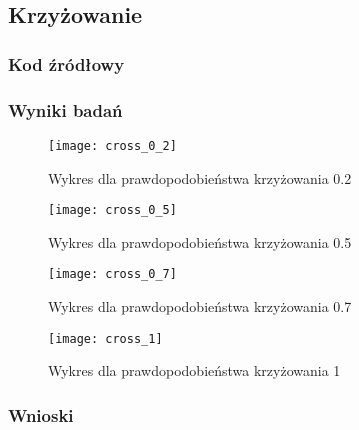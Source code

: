 \subsection{Krzyżowanie}

\subsubsection{Kod źródłowy}



\subsubsection{Wyniki badań}

\begin{figure}[H]
	\centering
	\hspace*{-0.8in}
	\texttt{[image: cross\_0\_2]}
	\caption{Wykres dla prawdopodobieństwa krzyżowania 0.2}  
	\label{rys:cross_0_2} 
\end{figure}


\begin{figure}[H]
	\centering
	\hspace*{-0.8in}
	\texttt{[image: cross\_0\_5]}
	\caption{Wykres dla prawdopodobieństwa krzyżowania 0.5}  
	\label{rys:cross_0_5} 
\end{figure}


\begin{figure}[H]
	\centering
	\hspace*{-0.8in}
	\texttt{[image: cross\_0\_7]}
	\caption{Wykres dla prawdopodobieństwa krzyżowania 0.7}  
	\label{rys:cross_0_7} 
\end{figure}


\begin{figure}[H]
	\centering
	\hspace*{-0.8in}
	\texttt{[image: cross\_1]}
	\caption{Wykres dla prawdopodobieństwa krzyżowania 1}  
	\label{rys:cross_1} 
\end{figure}


\subsubsection{Wnioski}

